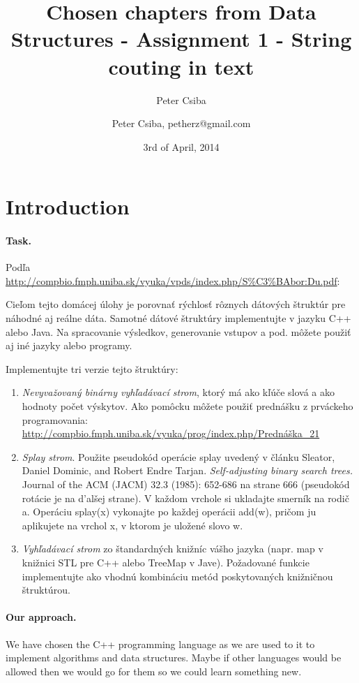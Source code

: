 \documentclass[12pt,a4paper]{article}
\author{Peter Csiba}
\title{Chosen chapters from Data Structures - Assignment 1 - String couting in text}
\date{3rd of April, 2014}
\author{Peter Csiba, petherz@gmail.com}
\begin{document}
\maketitle

\section*{Introduction}

\paragraph{Task.}
Podľa \url{http://compbio.fmph.uniba.sk/vyuka/vpds/index.php/S\%C3\%BAbor:Du.pdf}:

Cieľom tejto domácej úlohy je porovnať rýchlosť rôznych dátových štruktúr pre náhodné aj
reálne dáta. Samotné dátové štruktúry implementujte v jazyku C++ alebo Java. Na spracovanie
výsledkov, generovanie vstupov a pod. môžete použiť aj iné jazyky alebo programy.

Implementujte tri verzie tejto štruktúry:
\begin{enumerate} 
\item \emph{Nevyvažovaný binárny vyhľadávací strom}, ktorý má ako kľúče slová a ako hodnoty počet výskytov. Ako pomôcku môžete použiť prednášku z prváckeho programovania: \url{http://compbio.fmph.uniba.sk/vyuka/prog/index.php/Prednáška_21} 
\item \emph{Splay strom}. Použite pseudokód operácie splay uvedený v článku Sleator, Daniel Dominic, and Robert Endre Tarjan. \emph{Self-adjusting binary search trees.} Journal of the ACM (JACM) 32.3 (1985): 652-686 na strane 666 (pseudokód rotácie je na d’alšej strane). V každom vrchole si ukladajte smerník na rodič a. Operáciu splay(x) vykonajte po každej operácii add(w), pričom ju aplikujete na vrchol x, v ktorom je uložené slovo w.
\item \emph{Vyhľadávací strom} zo štandardných knižníc vášho jazyka (napr. map v knižnici STL pre C++ alebo TreeMap v Jave). Požadované funkcie implementujte ako vhodnú kombináciu metód poskytovaných knižničnou štruktúrou.
\end{enumerate} 

\paragraph{Our approach.} 
We have chosen the C++ programming language as we are used to it to implement algorithms and data structures. Maybe if other languages would be allowed then we would go for them so we could learn something new. 
\end{document}
